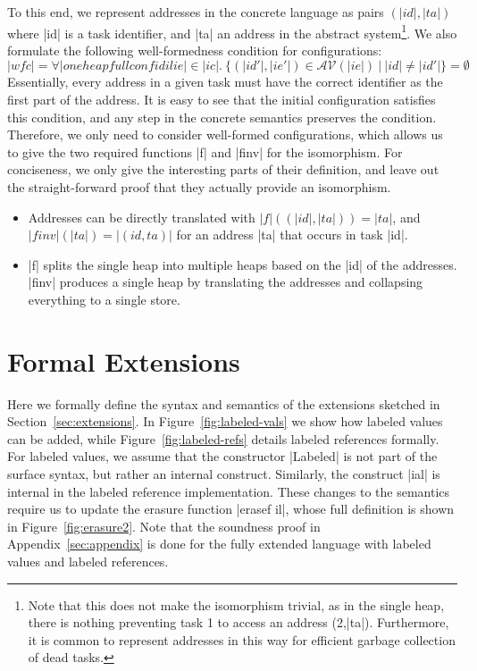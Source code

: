 To this end, we represent addresses in the concrete language as
pairs $(|id|,|ta|)$ where |id| is a task identifier, and |ta| an
address in the abstract system\footnote{Note that this does
  not make the isomorphism trivial, as in the single heap, there
  is nothing preventing task 1 to access an address (2,|ta|).
  Furthermore, it is common to represent addresses in this way
  for efficient garbage collection of dead tasks.}.
We also formulate the following well-formedness condition for
configurations:
\[
  |wf c| = \forall |oneheapfullconf id il ie| \in |ic|.\ 
  \{ (|id'|,|ie'|) \in \mathcal{AV}(|ie|) \ \vert\ |id| \neq |id'| \} = \emptyset
\]
Essentially, every address in a given task must have the correct
identifier as the first part of the address.  It is easy to
see that the initial configuration satisfies this condition, and
any step in the concrete semantics preserves the condition.
Therefore, we only need to consider well-formed configurations,
which allows us to give the two required functions
|f| and |finv| for the isomorphism.  For conciseness, we only give
the interesting parts of their definition,
and leave out the straight-forward proof that they
actually provide an isomorphism.
\begin{itemize}
  \item Addresses can be directly translated with
  $|f|((|id|,|ta|))=|ta|$, and $|finv|(|ta|)=|(id,ta)|$ for
  an address |ta| that occurs in task |id|.
  \item |f| splits the single heap into multiple heaps based on
  the |id| of the addresses.  |finv| produces a single heap
  by translating the addresses and collapsing everything to a single
  store.
\end{itemize}



\section{Formal Extensions}
\label{sec:appendix-extensions}

Here we formally define the syntax and semantics of the extensions
sketched in Section~\ref{sec:extensions}.
In Figure~\ref{fig:labeled-vals} we show how labeled values can be added,
while Figure~\ref{fig:labeled-refs} details labeled references formally.
For labeled values, we assume that the constructor |Labeled| is not part
of the surface syntax, but rather an internal construct.  Similarly,
the construct |ial| is internal in the labeled reference implementation.
These changes to the semantics require us to update the erasure function
|erasef il|, whose full definition is shown in Figure~\ref{fig:erasure2}.
Note that the soundness proof in Appendix~\ref{sec:appendix}
is done for the fully extended language with labeled values and
labeled references.

